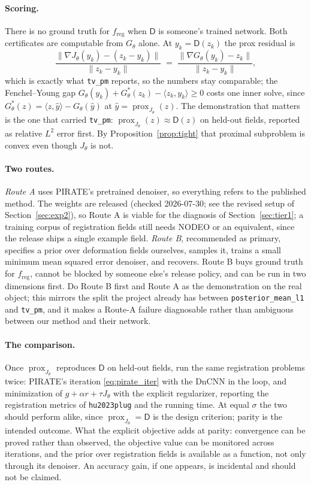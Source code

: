 \documentclass[11pt]{article}
\theoremstyle{definition}
\newcommand{\D}{\mathsf{D}}
\newcommand{\freg}{f_{\mathrm{reg}}}
\newcommand{\prox}{\operatorname{prox}}
\newcommand{\code}[1]{\texttt{#1}}
\begin{document}
\paragraph{Scoring.} There is no ground truth for $\freg$ when $\D$ is someone's trained network. Both certificates are computable from $G_\theta$ alone. At $y_k = \D(z_k)$ the prox residual is
\[
\frac{\|\nabla J_\theta(y_k) - (z_k-y_k)\|}{\|z_k-y_k\|} \;=\; \frac{\|\nabla G_\theta(y_k) - z_k\|}{\|z_k-y_k\|},
\]
which is exactly what \code{tv\_pm} reports, so the numbers stay comparable; the Fenchel--Young gap $G_\theta(y_k)+G_\theta^*(z_k)-\langle z_k,y_k\rangle\ge0$ costs one inner solve, since $G_\theta^*(z) = \langle z,\hat y\rangle - G_\theta(\hat y)$ at $\hat y = \prox_{J_\theta}(z)$. The demonstration that matters is the one that carried \code{tv\_pm}: $\prox_{J_\theta}(z)\approx\D(z)$ on held-out fields, reported as relative $L^2$ error first. By Proposition~\ref{prop:tight} that proximal subproblem is convex even though $J_\theta$ is not.

\paragraph{Two routes.} \emph{Route A} uses PIRATE's pretrained denoiser, so everything refers to the published method. The weights are released (checked 2026-07-30; see the revised setup of Section~\ref{sec:exp2}), so Route A is viable for the diagnosis of Section~\ref{sec:tier1}; a training corpus of registration fields still needs NODEO or an equivalent, since the release ships a single example field. \emph{Route B}, recommended as primary, specifies a prior over deformation fields ourselves, samples it, trains a small minimum mean squared error denoiser, and recovers. Route B buys ground truth for $\freg$, cannot be blocked by someone else's release policy, and can be run in two dimensions first. Do Route B first and Route A as the demonstration on the real object; this mirrors the split the project already has between \code{posterior\_mean\_l1} and \code{tv\_pm}, and it makes a Route-A failure diagnosable rather than ambiguous between our method and their network.

\paragraph{The comparison.} Once $\prox_{J_\theta}$ reproduces $\D$ on held-out fields, run the same registration problems twice: PIRATE's iteration \eqref{eq:pirate_iter} with the DnCNN in the loop, and minimization of $g + \alpha r + \tau J_\theta$ with the explicit regularizer, reporting the registration metrics of \code{hu2023plug} and the running time. At equal $\sigma$ the two should perform alike, since $\prox_{J_\theta} = \D$ is the design criterion; parity is the intended outcome. What the explicit objective adds at parity: convergence can be proved rather than observed, the objective value can be monitored across iterations, and the prior over registration fields is available as a function, not only through its denoiser. An accuracy gain, if one appears, is incidental and should not be claimed.
\end{document}
